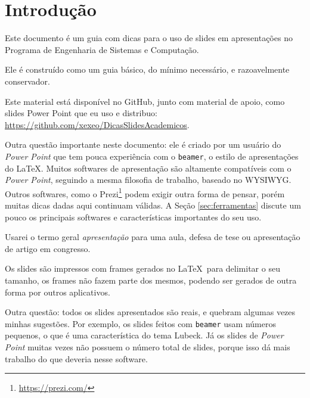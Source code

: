 \section{Introdução}

Este documento é um guia com dicas para o uso de slides em apresentações no Programa de Engenharia de Sistemas e Computação.

Ele é construído como um guia básico, do mínimo necessário, e razoavelmente conservador.

Este material está disponível no GitHub, junto com material de apoio, como slides Power Point que eu uso e distribuo: \url{https://github.com/xexeo/DicasSlidesAcademicos}.

Outra questão importante neste documento: ele é criado por um usuário do \textit{Power Point} que tem pouca experiência com o \texttt{beamer}, o estilo de apresentações do \LaTeX. Muitos softwares de apresentação são altamente compatíveis com o \textit{Power Point}, seguindo a mesma filosofia de trabalho, baseado no WYSIWYG. Outros softwares, como o Prezi\footnote{\url{https://prezi.com/}} podem exigir outra forma de pensar, porém muitas dicas dadas aqui continuam válidas. A Seção \ref{sec:ferramentas} discute um pouco os principais softwares e características importantes do seu uso.

Usarei o termo geral \textit{apresentação} para uma aula, defesa de tese ou apresentação de artigo em congresso.

Os slides são impressos com frames gerados no \LaTeX\ para delimitar o seu tamanho, os frames não fazem parte dos mesmos, podendo ser gerados de outra forma por outros aplicativos.

Outra questão: todos os slides apresentados são reais, e quebram algumas vezes minhas sugestões. Por exemplo, os slides feitos com \texttt{beamer} usam números pequenos, o que é uma característica do tema Lubeck. Já os slides de \textit{Power Point} muitas vezes não possuem o número total de slides, porque isso dá mais trabalho do que deveria nesse software.
